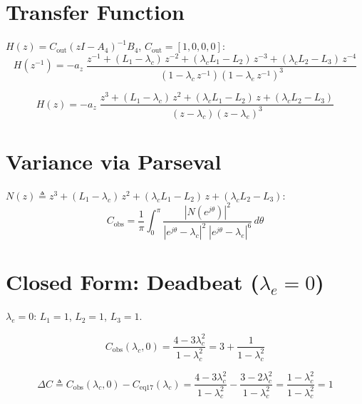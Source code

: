\documentclass[11pt,a4paper]{article}
\newcommand{\az}{a_z}
\newcommand{\lc}{\lambda_c}
\renewcommand{\le}{\lambda_e}
\begin{document}
\section{Transfer Function}

$H(z) = C_{\mathrm{out}}(zI-A_4)^{-1}B_4$,\;
$C_{\mathrm{out}}=[1,0,0,0]$:
\begin{equation}
  H(z^{-1})
  = -\az\;\frac{z^{-1}+(L_1\!-\!\lc)\,z^{-2}
    +(\lc L_1\!-\!L_2)\,z^{-3}
    +(\lc L_2\!-\!L_3)\,z^{-4}}
  {(1-\lc\,z^{-1})(1-\le\,z^{-1})^{3}}
  \label{eq:Hzinv}
\end{equation}

\begin{equation}
  H(z)
  = -\az\;\frac{z^{3}+(L_1\!-\!\lc)\,z^{2}
    +(\lc L_1\!-\!L_2)\,z
    +(\lc L_2\!-\!L_3)}
  {(z-\lc)(z-\le)^{3}}
  \label{eq:Hz}
\end{equation}

\section{Variance via Parseval}

$N(z)\triangleq z^{3}+(L_1\!-\!\lc)\,z^{2}+(\lc L_1\!-\!L_2)\,z+(\lc L_2\!-\!L_3)$:
\begin{equation}
  C_{\mathrm{obs}}
  = \frac{1}{\pi}\int_{0}^{\pi}
    \frac{|N(e^{j\theta})|^{2}}
         {|e^{j\theta}\!-\!\lc|^{2}\;|e^{j\theta}\!-\!\le|^{6}}
    \,d\theta
  \label{eq:parseval}
\end{equation}

\section{Closed Form: Deadbeat ($\le=0$)}

$\le=0$:\; $L_1=1$, $L_2=1$, $L_3=1$.

\begin{equation}
  C_{\mathrm{obs}}(\lc,0)
  = \frac{4-3\lc^2}{1-\lc^2}
  = 3 + \frac{1}{1-\lc^2}
  \label{eq:Cpp-db}
\end{equation}

\begin{equation}
  \boxed{\;
  \Delta C
  \triangleq C_{\mathrm{obs}}(\lc,0) - C_{\mathrm{eq17}}(\lc)
  = \frac{4-3\lc^2}{1-\lc^2} - \frac{3-2\lc^2}{1-\lc^2}
  = \frac{1-\lc^2}{1-\lc^2}
  = 1
  \;}
  \label{eq:deltaC}
\end{equation}
\end{document}
